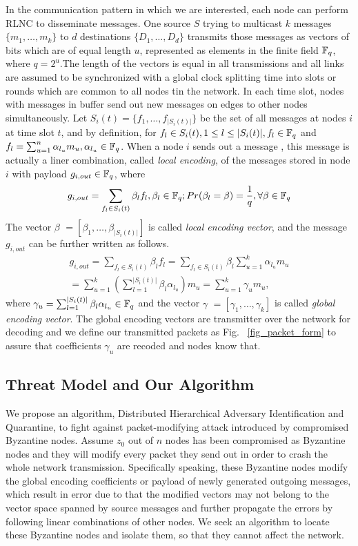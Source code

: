 \documentclass[conference]{IEEEtran}
\begin{document}
In the communication pattern in which we are interested, each node can perform RLNC to disseminate messages. One source $S$ trying to multicast $k$ messages $\{m_1,\dots ,m_k\}$ to $d$ destinations $\{D_1,\dots ,D_d\}$ transmits those messages as vectors of bits which are of equal length $u$, represented as elements in the finite field $\Bbb{F}_q$, where $q=2^u$.The length of the vectors is equal in all transmissions and all links are assumed to be synchronized with a global clock splitting time into slots or rounds which are common to all nodes tin the network. In each time slot, nodes with messages in buffer send out new messages on edges to other nodes simultaneously. Let $S_i (t)=\{f_1,\dots ,f_{|S_i (t)|}\}$ be the set of all messages at nodes $i$ at time slot $t$, and by definition, for $f_l \in S_i (t) , 1\leq l\leq |S_i (t)| , f_l \in \Bbb{F}_q$ and $f_l = \sum_{u=1}^n{\alpha_{l_u}m_u}, \alpha_{l_u} \in \Bbb{F}_q$. When a node $i$ sends out a message , this message is actually a liner combination, called \emph{local encoding}, of the messages stored in node $i$ with payload $g_{i,out} \in \Bbb{F}_q$, where
\[
g_{i,out} = \sum_{f_l \in S_i (t)}{\beta_l f_l}, \beta_l \in \Bbb{F}_q; Pr(\beta_l = \beta) = {1\over q}, \forall \beta \in \Bbb{F}_q
\]
The vector {\boldmath$\beta$} $=[\beta_1,\dots ,\beta_{|S_i (t)|}]$ is called \emph{local encoding vector}, and the message $g_{i,out}$ can be further written as follows.
\begin{equation*}
\begin{aligned}
g_{i,out}=\sum_{f_l \in S_i (t)}{\beta_l f_l}= \sum_{f_l \in S_i (t)}{\beta_l  \sum_{u=1}^k{\alpha_{l_u}m_u}}\\
= \sum_{u=1}^k{\left(\sum_{l=1}^{|S_i (t)|}{\beta_l \alpha_{l_u}}\right)m_u}=\sum_{u=1}^k{\gamma_u m_u}, 
\end{aligned}
\end{equation*}
where $\gamma_u =\sum_{l=1}^{|S_i (t)|}{\beta_l \alpha_{l_u}} \in \Bbb{F}_q$ and the vector {\boldmath$\gamma$} $=[\gamma_1, \dots ,\gamma_k]$ is called \emph{global encoding vector}. The global encoding vectors are transmitter over the network for decoding and we define our transmitted packets as Fig. ~\ref{fig_packet_form} to assure that coefficients $\gamma_u$ are recoded and nodes know that.

\subsection{Threat Model and Our Algorithm}
We propose an algorithm, Distributed Hierarchical Adversary Identification and Quarantine, to fight against packet-modifying attack introduced by compromised Byzantine nodes. Assume $z_0$ out of $n$ nodes has been compromised as Byzantine nodes and they will modify every packet they send out in order to crash the whole network transmission. Specifically speaking, these Byzantine nodes modify the global encoding coefficients or payload of newly generated outgoing messages, which result in error due to that the modified vectors may not belong to the vector space spanned by source messages and further propagate the errors by following linear combinations of other nodes. We seek an algorithm to locate these Byzantine nodes and isolate them, so that they cannot affect the network.
\end{document}
